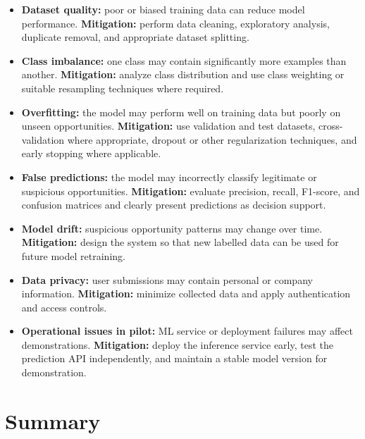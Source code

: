 \documentclass[11pt,a4paper]{article}
\begin{document}
\begin{itemize}[leftmargin=0.7cm]

    \item \textbf{Dataset quality:} poor or biased training data can reduce
    model performance. \textbf{Mitigation:} perform data cleaning,
    exploratory analysis, duplicate removal, and appropriate dataset
    splitting.

    \item \textbf{Class imbalance:} one class may contain significantly more
    examples than another. \textbf{Mitigation:} analyze class distribution
    and use class weighting or suitable resampling techniques where required.

    \item \textbf{Overfitting:} the model may perform well on training data
    but poorly on unseen opportunities. \textbf{Mitigation:} use validation
    and test datasets, cross-validation where appropriate, dropout or other
    regularization techniques, and early stopping where applicable.

    \item \textbf{False predictions:} the model may incorrectly classify
    legitimate or suspicious opportunities. \textbf{Mitigation:} evaluate
    precision, recall, F1-score, and confusion matrices and clearly present
    predictions as decision support.

    \item \textbf{Model drift:} suspicious opportunity patterns may change
    over time. \textbf{Mitigation:} design the system so that new labelled
    data can be used for future model retraining.

    \item \textbf{Data privacy:} user submissions may contain personal or
    company information. \textbf{Mitigation:} minimize collected data and
    apply authentication and access controls.

    \item \textbf{Operational issues in pilot:} ML service or deployment
    failures may affect demonstrations. \textbf{Mitigation:} deploy the
    inference service early, test the prediction API independently, and
    maintain a stable model version for demonstration.
\end{itemize}

\section{Summary}
\end{document}
